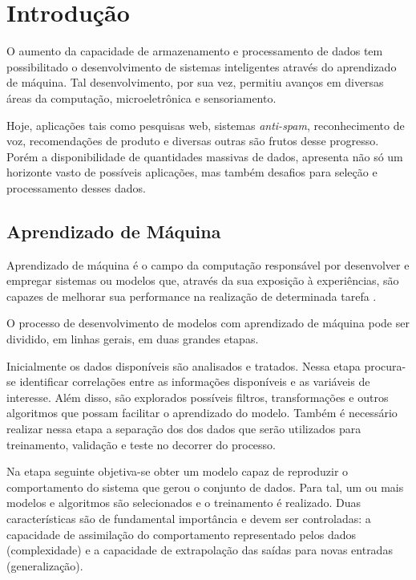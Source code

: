 \chapter[Introdução]{Introdução}

O aumento da capacidade de armazenamento e processamento de dados tem possibilitado o desenvolvimento de sistemas inteligentes através do aprendizado de máquina. Tal desenvolvimento, por sua vez, permitiu avanços em diversas áreas da computação, microeletrônica e sensoriamento. 

Hoje, aplicações tais como pesquisas web, sistemas \textit{anti-spam}, reconhecimento de voz, recomendações de produto e diversas outras são frutos desse progresso. Porém a disponibilidade de quantidades massivas de dados, apresenta não só um horizonte vasto de possíveis aplicações, mas também desafios para seleção e processamento desses dados.


\section{Aprendizado de Máquina}

Aprendizado de máquina é o campo da computação responsável por desenvolver e empregar sistemas ou modelos que, através da sua exposição à experiências, são capazes de melhorar sua performance na realização de determinada tarefa \cite{mitchell_1997}.

O processo de desenvolvimento de modelos com aprendizado de máquina pode ser dividido, em linhas gerais, em duas grandes etapas. 

Inicialmente os dados disponíveis são analisados e tratados. Nessa etapa procura-se identificar correlações entre as informações disponíveis e as variáveis de interesse. Além disso, são explorados possíveis filtros, transformações e outros algoritmos que possam facilitar o aprendizado do modelo. Também é necessário realizar nessa etapa a separação dos dos dados que serão utilizados para treinamento, validação e teste no decorrer do processo.

Na etapa seguinte objetiva-se obter um modelo capaz de reproduzir o comportamento do sistema que gerou o conjunto de dados. Para tal, um ou mais modelos e algoritmos são selecionados e o treinamento é realizado. Duas características são de fundamental importância e devem ser controladas: a capacidade de assimilação do comportamento representado pelos dados (complexidade) e a capacidade de extrapolação das saídas para novas entradas (generalização).



